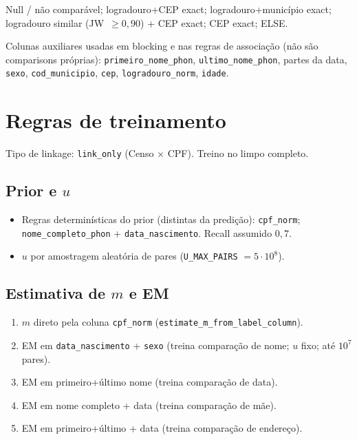 \documentclass[11pt,a4paper]{article}
\begin{document}
Null / não comparável; logradouro+CEP exact; logradouro+município exact;
logradouro similar (JW~$\ge 0{,}90$) + CEP exact; CEP exact; ELSE.

Colunas auxiliares usadas em blocking e nas regras de associação (não são
comparisons próprias): \texttt{primeiro\_nome\_phon},
\texttt{ultimo\_nome\_phon}, partes da data, \texttt{sexo},
\texttt{cod\_municipio}, \texttt{cep}, \texttt{logradouro\_norm},
\texttt{idade}.

\section{Regras de treinamento}

Tipo de linkage: \texttt{link\_only} (Censo $\times$ CPF). Treino no limpo
completo.

\subsection{Prior e $u$}

\begin{itemize}
  \item Regras determinísticas do prior (distintas da predição):
        \texttt{cpf\_norm}; \texttt{nome\_completo\_phon} +
        \texttt{data\_nascimento}. Recall assumido $0{,}7$.
  \item $u$ por amostragem aleatória de pares
        (\texttt{U\_MAX\_PAIRS} $= 5{\cdot}10^8$).
\end{itemize}

\subsection{Estimativa de $m$ e EM}

\begin{enumerate}
  \item $m$ direto pela coluna \texttt{cpf\_norm}
        (\texttt{estimate\_m\_from\_label\_column}).
  \item EM em \texttt{data\_nascimento} + \texttt{sexo} (treina comparação de
        nome; $u$ fixo; até $10^7$ pares).
  \item EM em primeiro+último nome (treina comparação de data).
  \item EM em nome completo + data (treina comparação de mãe).
  \item EM em primeiro+último + data (treina comparação de endereço).
\end{enumerate}
\end{document}
